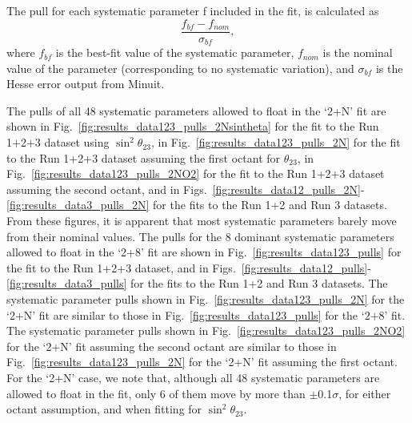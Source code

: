 The pull for each systematic parameter f included in the fit, is calculated as
\begin{equation}
  \frac{f_{bf} - f_{nom}}{\sigma_{bf}},
  \label{eqn:bfpull}
\end{equation}
where 
$f_{bf}$ is the best-fit value of the systematic parameter,
$f_{nom}$ is the nominal value of the parameter (corresponding to no systematic variation), and
$\sigma_{bf}$ is the Hesse error output from Minuit.

The pulls of all 48 systematic parameters allowed to float in the `2+N' fit are shown in
Fig.\ \ref{fig:results_data123_pulls_2Nsintheta} for the fit to the Run 1+2+3 dataset using $\sin^2\theta_{23}$, in
Fig.\ \ref{fig:results_data123_pulls_2N} for the fit to the Run 1+2+3 dataset assuming the first octant for $\theta_{23}$, in
Fig.\ \ref{fig:results_data123_pulls_2NO2} for the fit to the Run 1+2+3 dataset assuming the second octant, and in 
Figs.\ \ref{fig:results_data12_pulls_2N}-\ref{fig:results_data3_pulls_2N} for the
fits to the Run 1+2 and Run 3 datasets.
From these figures, it is apparent that most systematic parameters barely move from their nominal values.
The pulls for the 8 dominant systematic parameters allowed to float in the `2+8' fit are shown in 
Fig.\ \ref{fig:results_data123_pulls} for the fit to the Run 1+2+3 dataset, and in 
Figs.\ \ref{fig:results_data12_pulls}-\ref{fig:results_data3_pulls} for the
fits to the Run 1+2 and Run 3 datasets.
The systematic parameter pulls shown in Fig.\ \ref{fig:results_data123_pulls_2N} for the `2+N' fit are 
similar to those in Fig.\ \ref{fig:results_data123_pulls} for the `2+8' fit.
The systematic parameter pulls shown in Fig.\ \ref{fig:results_data123_pulls_2NO2} for the `2+N' fit
assuming the second octant are 
similar to those in Fig.\ \ref{fig:results_data123_pulls_2N} for the `2+N' fit assuming the first octant.
For the `2+N' case, we note that, although all 48 systematic parameters are allowed to float in the fit,
only 6 of them move by more than $\pm$0.1$\sigma$, for either octant assumption, and when
fitting for $\sin^2\theta_{23}$.


